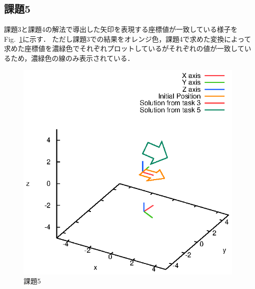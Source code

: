 \documentclass[a4paper,10pt]{jsarticle}
\begin{document}
\subsection{課題5}
課題3と課題4の解法で導出した矢印を表現する座標値が一致している様子をFig.~\ref{fig:課題5}に示す．
ただし課題3での結果をオレンジ色，課題4で求めた変換によって求めた座標値を濃緑色でそれぞれプロットしているがそれぞれの値が一致しているため，濃緑色の線のみ表示されている．

\begin{figure}[htb]
  \begin{center}
    \includegraphics[clip,width=14cm]{fig/eps/5.eps}
  \end{center}
  \caption{課題5}
  \label{fig:課題5}
\end{figure}
\end{document}
